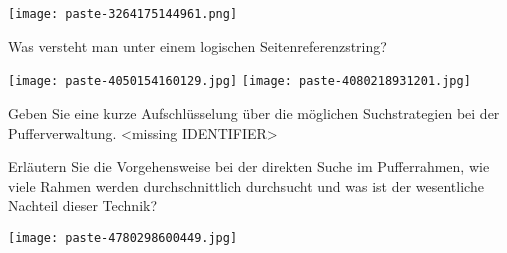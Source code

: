 \documentclass{article}
\begin{document}
\begin{tcolorbox}[colback=white!10!white,colframe=lightgray!75!black,
  savelowerto=\jobname_ex.tex]

\begin{center}
\texttt{[image: paste-3264175144961.png]}

\end{center}

\tcblower

\justifying

\end{tcolorbox}
\begin{tcolorbox}[colback=white!10!white,colframe=lightgray!75!black,
  savelowerto=\jobname_ex.tex]

\begin{center}
 Was versteht man unter einem 
logischen
Seitenreferenzstring? 

\end{center}

\tcblower

\justifying
\texttt{[image: paste-4050154160129.jpg]}
\texttt{[image: paste-4080218931201.jpg]}

\end{tcolorbox}
\begin{tcolorbox}[colback=white!10!white,colframe=lightgray!75!black,
  savelowerto=\jobname_ex.tex]

\begin{center}
 Geben Sie eine kurze Aufschlüsselung über die möglichen Suchstrategien bei der 
Pufferverwaltung.
 <missing IDENTIFIER>

\end{center}

\tcblower

\justifying

\end{tcolorbox}
\begin{tcolorbox}[colback=white!10!white,colframe=lightgray!75!black,
  savelowerto=\jobname_ex.tex]

\begin{center}
 Erläutern Sie die 
Vorgehensweise 
bei der direkten Suche im Pufferrahmen, wie viele Rahmen werden durchschnittlich durchsucht und was ist der wesentliche Nachteil dieser Technik? 

\end{center}

\tcblower

\justifying
\texttt{[image: paste-4780298600449.jpg]}

\end{tcolorbox}
\end{document}
